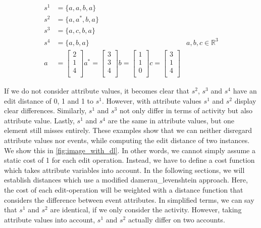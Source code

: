 \documentclass[./../../paper.tex]{subfiles}
\begin{document}
\begin{align}
    \label{eq:dlexample}
    s^1 &=\{a,a,b,a\} \\
    s^2 &=\{a,a^*,b,a\}\\
    s^3 &=\{a,c,b,a\}\\
    s^4 &=\{a,b,a\}
    &a,b,c \in \mathbb{R}^3\\
    a &= \begin{bmatrix}
        2\\
        1\\
        4\\
    \end{bmatrix}
    a^* = \begin{bmatrix}
        3\\
        3\\
        4\\
    \end{bmatrix}
    b = \begin{bmatrix}
        1\\
        1\\
        0\\
    \end{bmatrix}
    c = \begin{bmatrix}
        3\\
        1\\
        4\\
    \end{bmatrix}
\end{align}

\noindent If we do not consider attribute values, it becomes clear that $s^2$, $s^3$ and $s^4$ have an edit distance of 0, 1 and 1 to $s^1$. However, with attribute values $s^1$ and $s^2$ display clear differences. Similarly, $s^1$ and $s^3$ not only differ in terms of activity but also attribute value. Lastly, $s^1$ and $s^4$ are the same in attribute values, but one element still misses entirely. These examples show that we can neither disregard attribute values nor events, while computing the edit distance of two \glspl{instance}. 
We show this in \autoref{fig:image_with_dl}. 
In other words, we cannot simply assume a static cost of 1 for each edit operation. Instead, we have to define a cost function which takes attribute variables into account. In the following sections, we will establish distances which use a modified \gls{damerau_levenshtein} approach. Here, the cost of each edit-operation will be weighted with a distance function that considers the difference between event attributes. In simplified terms, we can say that $s^1$ and $s^2$ are identical, if we only consider the activity. However, taking attribute values into account, $s^1$ and $s^2$ actually differ on two accounts. 
\end{document}
